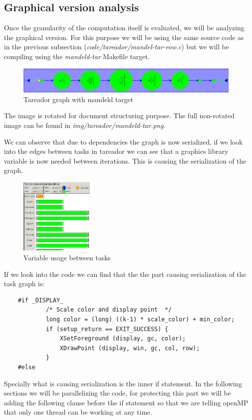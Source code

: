 \documentclass{article}
\begin{document}
 \subsection{Graphical version analysis}
\label{sec:graphical}
\justify
Once the granularity of the computation itself is evaluated, we will be analyzing the graphical version. For this purpose we will be using the same source code as in the previous subsection (\textit{code/tareador/mandel-tar-row.c}) but we will be compiling using the \textit{mandeld-tar} Makefile target. 


\begin{figure}[ht]
    \centering
    \includegraphics[width=0.99\textwidth]{r-mandeld.png}
    \caption{Tareador graph with mandeld target}
    \label{fig:tareadormandeld}
\end{figure}

\justify
The image is rotated for document structuring purpose. The full non-rotated image can be found in \textit{img/tareador/mandeld-tar.png}.

\justify
We can observe that due to dependencies the graph is now serialized, if we look into the edges between tasks in tareador we can see that a graphics library variable is now needed between iterations. This is causing the serialization of the graph.

\begin{figure}[h]
    \centering
    \includegraphics[width=0.32\textwidth]{mandeld-tar-edge.png}
    \caption{Variable usage between tasks}
    \label{fig:mandeldtaredge}
\end{figure}
\justify
If we look into the code we can find that the the part causing serialization of the task graph is:

\begin{lstlisting}
    #if _DISPLAY_
            /* Scale color and display point  */
            long color = (long) ((k-1) * scale_color) + min_color;
            if (setup_return == EXIT_SUCCESS) {
                XSetForeground (display, gc, color);
                XDrawPoint (display, win, gc, col, row);
            }
    #else
\end{lstlisting}
\justify
Specially what is causing serialization is the inner if statement. In the following sections we will be parallelizing the code, for protecting this part we will be adding the following clause before the if statement so that we are telling openMP that only one thread can be working at any time.
\end{document}
